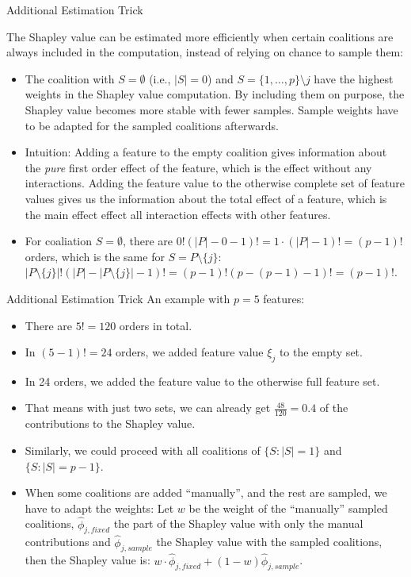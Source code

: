 \documentclass[11pt,compress,t,notes=noshow, aspectratio=169, xcolor=table]{beamer}
\begin{document}
\begin{vbframe}{Additional Estimation Trick}


  The Shapley value can be estimated more efficiently when certain coalitions are always included in the computation, instead of relying on chance to sample them:
  \vspace{0.25cm}
  \begin{itemize}
  \itemsep1em
    \item The coalition with $S = \emptyset$ (i.e., $|S| = 0$) and $S = \{1, \ldots, p\} \setminus j$ have the highest weights in the Shapley value computation. By including them on purpose, the Shapley value becomes more stable with fewer samples. Sample weights have to be adapted for the sampled coalitions afterwards.
    \item Intuition: Adding a feature to the empty coalition gives information about the \textit{pure} first order effect of the feature, which is the effect without any interactions. Adding the feature value to the otherwise complete set of feature values gives us the information about the total effect of a feature, which is the main effect effect all interaction effects with other features.
    \item For coaliation $S = \emptyset$, there are $0! (|P| - 0 - 1)! = 1 \cdot (|P| - 1)! = (p - 1)!$ orders, which is the same for $S = P \setminus \{j\}$: $|P \setminus \{j\}|! (|P| - |P \setminus \{j\}| - 1)! = (p - 1)! (p - (p-1) - 1)! = (p-1)!$.
\end{itemize}
 \end{vbframe}

\begin{vbframe}{Additional Estimation Trick}
An example with $p = 5$ features:
\vspace{0.25cm}
    \begin{itemize}
    \itemsep1em
        \item There are $5! = 120$ orders in total.
        \item In $(5 - 1)! = 24$ orders, we added feature value $\xi_j$ to the empty set.
        \item In 24 orders, we added the feature value to the otherwise full feature set.
        \item That means with just two sets, we can already get $\frac{48}{120} = 0.4$ of the contributions to the Shapley value.
        \item Similarly, we could proceed with all coalitions of $\{S: |S| = 1\}$ and $\{S: |S| = p - 1\}$.
        \item When some coalitions are added \enquote{manually}, and the rest are sampled, we have to adapt the weights: Let $w$ be the weight of the \enquote{manually} sampled coalitions, $\hat{\phi}_{j,fixed}$ the part of the Shapley value with only the manual contributions and $\hat{\phi}_{j,sample}$ the Shapley value with the sampled coalitions, then the Shapley value is: $w \cdot \hat{\phi}_{j,fixed} + (1 - w) \hat{\phi}_{j,sample}$.
  \end{itemize}
\end{vbframe}
\end{document}
